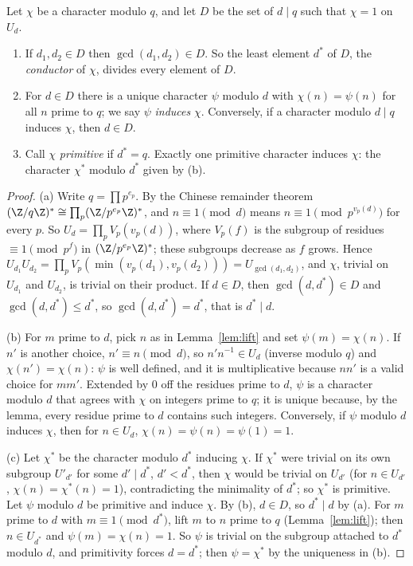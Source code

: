 \begin{proposition}\label{prop:conductor}
Let $\chi$ be a character modulo $q$, and let $D$ be the set of $d\mid q$ such that $\chi=1$ on $U_d$.
\begin{enumerate}[label=(\alph*)]
\item If $d_1,d_2\in D$ then $\gcd(d_1,d_2)\in D$. So the least element $d^*$ of $D$, the \emph{conductor} of $\chi$, divides every element of $D$.
\item For $d\in D$ there is a unique character $\psi$ modulo $d$ with $\chi(n)=\psi(n)$ for all $n$ prime to $q$; we say $\psi$ \emph{induces} $\chi$. Conversely,
if a character modulo $d\mid q$ induces $\chi$, then $d\in D$.
\item Call $\chi$ \emph{primitive} if $d^*=q$. Exactly one primitive character induces $\chi$: the character $\chi^*$ modulo $d^*$ given by (b).
\end{enumerate}
\end{proposition}
\begin{proof}
(a) Write $q=\prod p^{e_p}$. By the Chinese remainder theorem $(\Z/q\Z)^*\cong\prod_p(\Z/p^{e_p}\Z)^*$, and $n\equiv1\pmod d$ means $n\equiv1\pmod{p^{v_p(d)}}$
for every $p$. So $U_d=\prod_pV_p(v_p(d))$, where $V_p(f)$ is the subgroup of residues $\equiv1\pmod{p^f}$ in $(\Z/p^{e_p}\Z)^*$; these subgroups decrease
as $f$ grows. Hence $U_{d_1}U_{d_2}=\prod_pV_p(\min(v_p(d_1),v_p(d_2)))=U_{\gcd(d_1,d_2)}$, and $\chi$, trivial on $U_{d_1}$ and $U_{d_2}$, is trivial on their product.
If $d\in D$, then $\gcd(d,d^*)\in D$ and $\gcd(d,d^*)\le d^*$, so $\gcd(d,d^*)=d^*$, that is $d^*\mid d$.

(b) For $m$ prime to $d$, pick $n$ as in Lemma~\ref{lem:lift} and set $\psi(m)=\chi(n)$. If $n'$ is another choice, $n'\equiv n\pmod d$, so $n'n^{-1}\in U_d$ (inverse
modulo $q$) and $\chi(n')=\chi(n)$: $\psi$ is well defined, and it is multiplicative because $nn'$ is a valid choice for $mm'$. Extended by $0$ off the
residues prime to $d$, $\psi$ is a character modulo $d$ that agrees with $\chi$ on integers prime to $q$; it is unique because, by the lemma, every
residue prime to $d$ contains such integers. Conversely, if $\psi$ modulo $d$ induces $\chi$, then for $n\in U_d$, $\chi(n)=\psi(n)=\psi(1)=1$.

(c) Let $\chi^*$ be the character modulo $d^*$ inducing $\chi$. If $\chi^*$ were trivial on its own subgroup $U'_{d'}$ for some $d'\mid d^*$, $d'<d^*$,
then $\chi$ would be trivial on $U_{d'}$ (for $n\in U_{d'}$, $\chi(n)=\chi^*(n)=1$), contradicting the minimality of $d^*$; so $\chi^*$ is primitive. Let $\psi$
modulo $d$ be primitive and induce $\chi$. By (b), $d\in D$, so $d^*\mid d$ by (a). For $m$ prime to $d$ with $m\equiv1\pmod{d^*}$, lift $m$ to $n$ prime to $q$
(Lemma~\ref{lem:lift}); then $n\in U_{d^*}$ and $\psi(m)=\chi(n)=1$. So $\psi$ is trivial on the subgroup attached to $d^*$ modulo $d$, and primitivity
forces $d=d^*$; then $\psi=\chi^*$ by the uniqueness in (b).
\end{proof}


